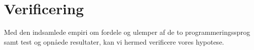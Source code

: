 \documentclass[class=report, crop=false]{standalone}
\begin{document}
    \section{Verificering}
    Med den indsamlede empiri om fordele og ulemper af de to programmeringssprog samt test og opnåede resultater, kan vi hermed verificere vores hypotese.
\end{document}

